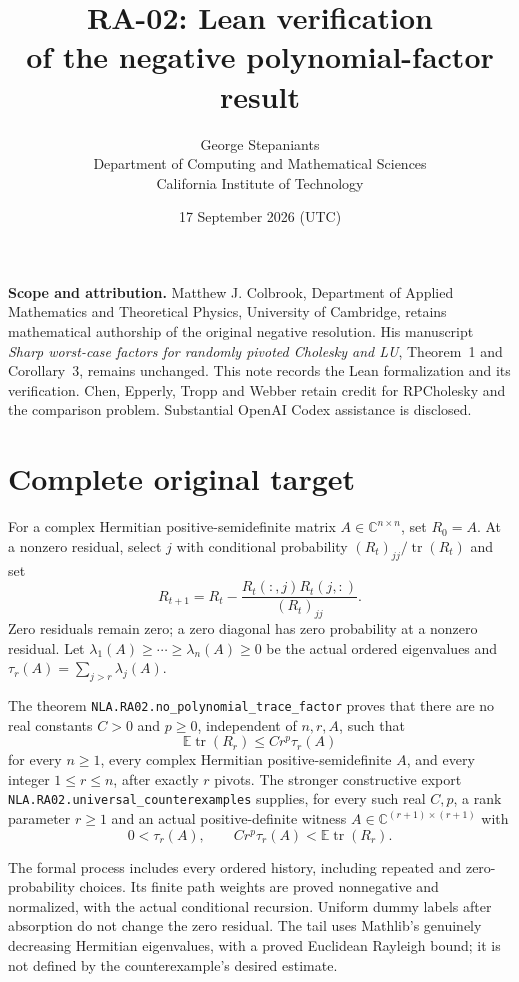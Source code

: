 \documentclass[11pt,a4paper]{article}
\title{\textbf{RA-02: Lean verification\\of the negative polynomial-factor result}}
\author{George Stepaniants\\[3pt]\small Department of Computing and Mathematical Sciences\\\small California Institute of Technology}
\date{17 September 2026 (UTC)}
\begin{document}
\maketitle

\textbf{Scope and attribution.}
Matthew J. Colbrook, Department of Applied Mathematics and Theoretical
Physics, University of Cambridge, retains mathematical authorship of the
original negative resolution. His manuscript \emph{Sharp worst-case factors
for randomly pivoted Cholesky and LU}, Theorem~1 and Corollary~3, remains
unchanged. This note records the Lean formalization and its verification.
Chen, Epperly, Tropp and Webber retain credit for RPCholesky and the comparison
problem. Substantial OpenAI Codex assistance is disclosed.

\section*{Complete original target}
For a complex Hermitian positive-semidefinite matrix
$A\in\mathbb C^{n\times n}$, set $R_0=A$. At a nonzero residual, select
$j$ with conditional probability $(R_t)_{jj}/\operatorname{tr}(R_t)$ and set
\[
 R_{t+1}=R_t-\frac{R_t(:,j)R_t(j,:)}{(R_t)_{jj}}.
\]
Zero residuals remain zero; a zero diagonal has zero probability at a
nonzero residual. Let $\lambda_1(A)\ge\cdots\ge\lambda_n(A)\ge0$ be the
actual ordered eigenvalues and $\tau_r(A)=\sum_{j>r}\lambda_j(A)$.

The theorem \texttt{NLA.RA02.no\_polynomial\_trace\_factor} proves that
there are no real constants $C>0$ and $p\ge0$, independent of $n,r,A$,
such that
\[
 \mathbb E\operatorname{tr}(R_r)\le C r^p\tau_r(A)
\]
for every $n\ge1$, every complex Hermitian positive-semidefinite $A$, and
every integer $1\le r\le n$, after exactly $r$ pivots.
The stronger constructive export
\nolinkurl{NLA.RA02.universal_counterexamples} supplies, for every such
real $C,p$, a rank parameter $r\ge1$ and an actual positive-definite witness
$A\in\mathbb C^{(r+1)\times(r+1)}$ with
\[
 0<\tau_r(A),\qquad
 C r^p\tau_r(A)<\mathbb E\operatorname{tr}(R_r).
\]

The formal process includes every ordered history, including repeated and
zero-probability choices. Its finite path weights are proved nonnegative
and normalized, with the actual conditional recursion. Uniform dummy labels
after absorption do not change the zero residual. The tail uses Mathlib's
genuinely decreasing Hermitian eigenvalues, with a proved Euclidean Rayleigh
bound; it is not defined by the counterexample's desired estimate.
\end{document}

